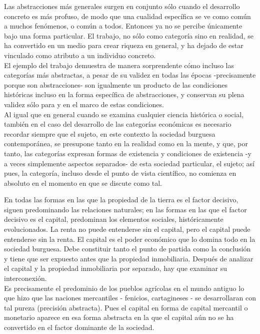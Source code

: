 Las abstracciones más generales surgen en conjunto sólo cuando el desarrollo concreto es más profuso, de modo que una cualidad específica se ve como común a muchos fenómenos, o común a todos. Entonces ya no se percibe únicamente bajo una forma particular. El trabajo, no sólo como categoría sino en realidad, se ha convertido en un medio para crear riqueza en general, y ha dejado de estar vinculado como atributo a un individuo concreto.\\
El ejemplo del trabajo demuestra de manera sorprendente cómo incluso las categorías más abstractas, a pesar de su validez en todas las épocas -precisamente porque son abstracciones- son igualmente un producto de las condiciones históricas incluso en la forma específica de abstracciones, y conservan su plena validez sólo para y en el marco de estas condiciones.\\

Al igual que en general cuando se examina cualquier ciencia histórica o social, también en el caso del desarrollo de las categorías económicas es necesario recordar siempre que el sujeto, en este contexto la sociedad burguesa contemporánea, se presupone tanto en la realidad como en la mente, y que, por tanto, las categorías expresan formas de existencia y condiciones de existencia -y a veces simplemente aspectos separados- de esta sociedad particular, el sujeto; así pues, la categoría, incluso desde el punto de vista científico, no comienza en absoluto en el momento en que se discute como tal. 

En todas las formas en las que la propiedad de la tierra es el factor decisivo, siguen predominando las relaciones naturales; en las formas en las que el factor decisivo es el capital, predominan los elementos sociales, históricamente evolucionados. La renta no puede entenderse sin el capital, pero el capital puede entenderse sin la renta. El capital es el poder económico que lo domina todo en la sociedad burguesa. Debe constituir tanto el punto de partida como la conclusión y tiene que ser expuesto antes que la propiedad inmobiliaria. Después de analizar el capital y la propiedad inmobiliaria por separado, hay que examinar su interconexión.\\

Es precisamente el predominio de los pueblos agrícolas en el mundo antiguo lo que hizo que las naciones mercantiles - fenicios, cartagineses - se desarrollaran con tal pureza (precisión abstracta). Pues el capital en forma de capital mercantil o monetario aparece en esa forma abstracta en la que el capital aún no se ha convertido en el factor dominante de la sociedad.\\

